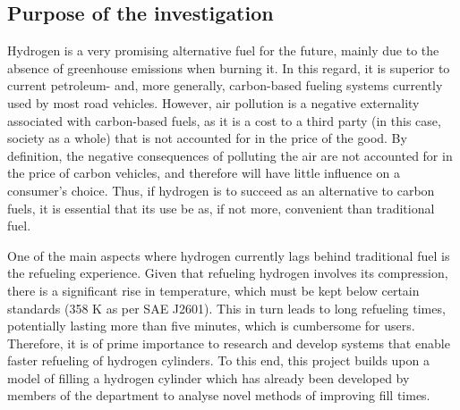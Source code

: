 
\subsection{Purpose of the investigation}

Hydrogen is a very promising alternative fuel for the future, mainly due to the absence of greenhouse emissions when burning it. In this regard, it is superior to current petroleum- and, more generally, carbon-based fueling systems currently used by most road vehicles.  However, air pollution is a negative externality associated with carbon-based fuels, as it is a cost to a third party (in this case, society as a whole) that is not accounted for in the price of the good. By definition, the negative consequences of polluting the air are not accounted for in the price of carbon vehicles, and therefore will have little influence on a consumer's choice. Thus, if hydrogen is to succeed as an alternative to carbon fuels, it is essential that its use be as, if not more, convenient than traditional fuel.

 One of the main aspects where hydrogen currently lags behind traditional fuel is the refueling experience. Given that refueling hydrogen involves its compression, there is a significant rise in temperature, which must be kept below certain standards (358 \degree K as per SAE J2601). This in turn leads to long refueling times, potentially lasting more than five minutes, which is cumbersome for users. Therefore, it is of prime importance to research and develop systems that enable faster refueling of hydrogen cylinders. To this end, this project builds upon a model of filling a hydrogen cylinder which has already been developed by members of the department to analyse novel methods of improving fill times.

